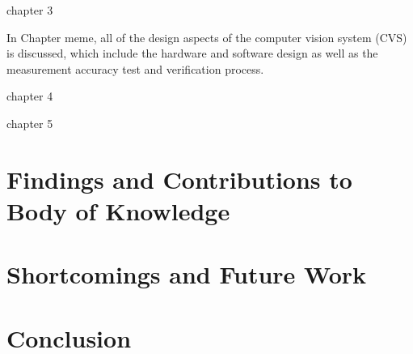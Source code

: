 chapter 3

In Chapter meme, all of the design aspects of the computer vision system (CVS) is discussed, which include the hardware and software design as well as the measurement accuracy test and verification process. 

chapter 4



chapter 5

\section{Findings and Contributions to Body of Knowledge}

\section{Shortcomings and Future Work}

\section{Conclusion}
